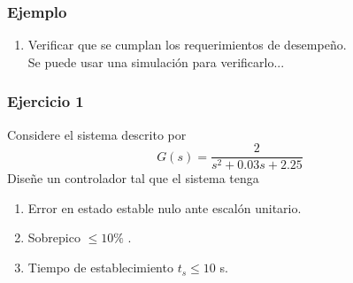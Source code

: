 \documentclass[aspectratio=169,handout]{beamer}
\theoremstyle{definition}
\theoremstyle{plain}
\theoremstyle{remark}
\newcounter{saveenumi}
\newcommand{\conti}{\setcounter{enumi}{\value{saveenumi}}}
\begin{document}
\begin{frame}[<+->]\frametitle{Ejemplo}
	\begin{enumerate}
		\conti
		\item Verificar que se cumplan los requerimientos de desempeño.\\
		\vspace*{5mm}
		Se puede usar una simulación para verificarlo...
	\end{enumerate}
\end{frame}

\begin{frame}[c]\frametitle{Ejercicio 1}
Considere el sistema descrito por
\begin{equation*}
	G(s) = \frac{2}{s^2 + 0.03s + 2.25}
\end{equation*}
Diseñe un controlador tal que el sistema tenga
\begin{enumerate}
	\item Error en estado estable nulo ante escalón unitario.
	\item Sobrepico $\leq 10\%$ .
	\item Tiempo de establecimiento $t_s \leq 10$ s.
\end{enumerate}
\end{frame}
\end{document}
